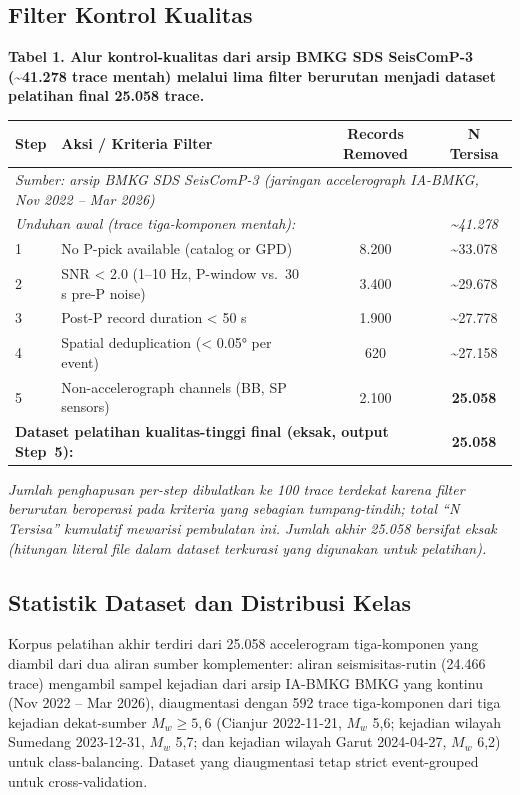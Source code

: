 \documentclass[10pt]{article}
\begin{document}
\subsection{Filter Kontrol Kualitas}

\par\vspace{16pt}\noindent\begingroup\centering\fontsize{8}{10}\selectfont\textbf{Tabel 1. Alur kontrol-kualitas dari arsip BMKG SDS SeisComP-3 (\textasciitilde41.278 trace mentah) melalui lima filter berurutan menjadi dataset pelatihan final 25.058 trace.}\par\endgroup\vspace{6pt}

\begin{longtable}[]{@{}llcc@{}}
\toprule
Step & Aksi / Kriteria Filter & Records Removed & N Tersisa\tabularnewline
\midrule
\endhead
\multicolumn{4}{l}{\textit{Sumber: arsip BMKG SDS SeisComP-3 (jaringan accelerograph IA-BMKG, Nov 2022 -- Mar 2026)}}\tabularnewline
\multicolumn{3}{l}{\textit{\quad Unduhan awal (trace tiga-komponen mentah):}} & \textit{\textasciitilde41.278}\tabularnewline
\midrule
1 & No P-pick available (catalog or GPD) & 8.200 & \textasciitilde33.078\tabularnewline
2 & SNR \textless{} 2.0 (1--10 Hz, P-window vs.~30 s pre-P noise) & 3.400 & \textasciitilde29.678\tabularnewline
3 & Post-P record duration \textless{} 50 s & 1.900 & \textasciitilde27.778\tabularnewline
4 & Spatial deduplication (\textless{} 0.05° per event) & 620 & \textasciitilde27.158\tabularnewline
5 & Non-accelerograph channels (BB, SP sensors) & 2.100 & \textbf{25.058}\tabularnewline
\midrule
\multicolumn{3}{l}{\textbf{Dataset pelatihan kualitas-tinggi final (eksak, output Step~5):}} & \textbf{25.058}\tabularnewline
\bottomrule
\end{longtable}

\noindent\textit{Jumlah penghapusan per-step dibulatkan ke 100 trace terdekat karena filter berurutan beroperasi pada kriteria yang sebagian tumpang-tindih; total ``N Tersisa'' kumulatif mewarisi pembulatan ini. Jumlah akhir 25.058 bersifat eksak (hitungan literal file dalam dataset terkurasi yang digunakan untuk pelatihan).}

\subsection{Statistik Dataset dan Distribusi Kelas}

Korpus pelatihan akhir terdiri dari 25.058 accelerogram tiga-komponen yang diambil dari dua aliran sumber komplementer: aliran seismisitas-rutin (24.466 trace) mengambil sampel kejadian dari arsip IA-BMKG BMKG yang kontinu (Nov 2022 -- Mar 2026), diaugmentasi dengan 592 trace tiga-komponen dari tiga kejadian dekat-sumber \(M_w \geq 5,6\) (Cianjur 2022-11-21, \(M_w\) 5,6; kejadian wilayah Sumedang 2023-12-31, \(M_w\) 5,7; dan kejadian wilayah Garut 2024-04-27, \(M_w\) 6,2) untuk class-balancing. Dataset yang diaugmentasi tetap strict event-grouped untuk cross-validation.
\end{document}
